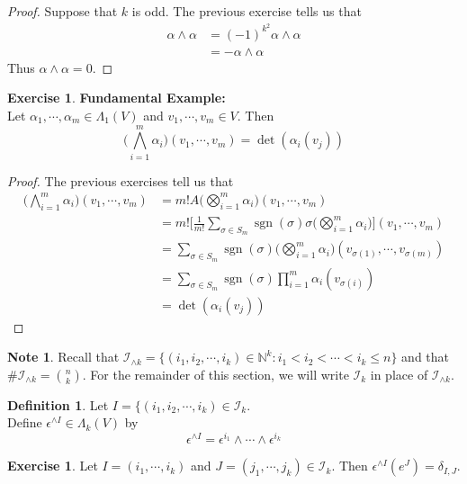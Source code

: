 \documentclass[12pt]{amsart}
\theoremstyle{definition}
\newtheorem{defn}[definition]{Definition}
\newtheorem{note}[definition]{Note}
\newtheorem{ex}[definition]{Exercise}
\newcommand{\al}{\alpha}
\newcommand{\del}{\delta}
\newcommand{\Lam}{\Lambda}
\newcommand{\ep}{\epsilon}
\newcommand{\sig}{\sigma}
\newcommand{\N}{\mathbb{N}}
\newcommand{\MI}{\mathcal{I}}
\DeclareMathOperator{\sgn}{sgn}
\begin{document}
	\begin{proof}
		Suppose that $k$ is odd. The previous exercise tells us that 
		\begin{align*}
			\al \wedge \al 
			&= (-1)^{k^2} \al \wedge \al \\
			&= -\al \wedge \al
		\end{align*}
		Thus $\al \wedge \al = 0$.
	\end{proof}
	
	\begin{ex}\textbf{Fundamental Example:}\\
		Let $\al_1, \cdots, \al_m \in \Lam_1(V)$ and $v_1, \cdots, v_m \in V$. Then $$\bigg( \bigwedge_{i=1}^m \al_i \bigg)(v_1, \cdots, v_m) = \det (\al_i (v_j))$$
	\end{ex}

	\begin{proof}
		The previous exercises tell us that
		\begin{align*}
			\bigg( \bigwedge_{i=1}^m \al_i \bigg)(v_1, \cdots, v_m)
			&= m! A\bigg( \bigotimes_{i=1}^m \al_i \bigg) (v_1, \cdots, v_m) \\
			&= m! \bigg[ \frac{1}{m!} \sum_{\sig \in S_{m}} \sgn(\sig) \sig \bigg(\bigotimes_{i=1}^m \al_i \bigg) \bigg] (v_1, \cdots, v_m) \\
			&= \sum_{\sig \in S_{m}} \sgn(\sig)  \bigg(\bigotimes_{i=1}^m \al_i \bigg) (v_{\sig(1)}, \cdots, v_{\sig(m)}) \\
			&= \sum_{\sig \in S_{m}} \sgn(\sig)  \prod_{i=1}^m \al_i(v_{\sig(i)})   \\
			&= \det (\al_i (v_j))
		\end{align*}
	\end{proof}

	\begin{note}
		Recall that $\MI_{\wedge k} = \{(i_1, i_2, \cdots, i_k) \in \N^k: i_1 < i_2 < \cdots < i_k \leq n \}$ and that $\# \MI_{\wedge k} = {n \choose k}$. For the remainder of this section, we will write $\MI_k$ in place of $\MI_{\wedge k}$.
	\end{note}

	\begin{defn}
		Let $I = \{(i_1, i_2, \cdots, i_k) \in \MI_k$. \\ Define $\ep^{\wedge I} \in \Lam_k(V)$ by $$ \ep^{\wedge I} = \ep^{i_1} \wedge \cdots \wedge \ep^{i_k} $$ 
	\end{defn}

	\begin{ex}
		Let $I = (i_1, \cdots, i_k)$ and $J = (j_1, \cdots, j_k) \in \MI_k$. Then $\ep^{\wedge I} (e^J) = \del_{I,J}$.
	\end{ex}
\end{document}
